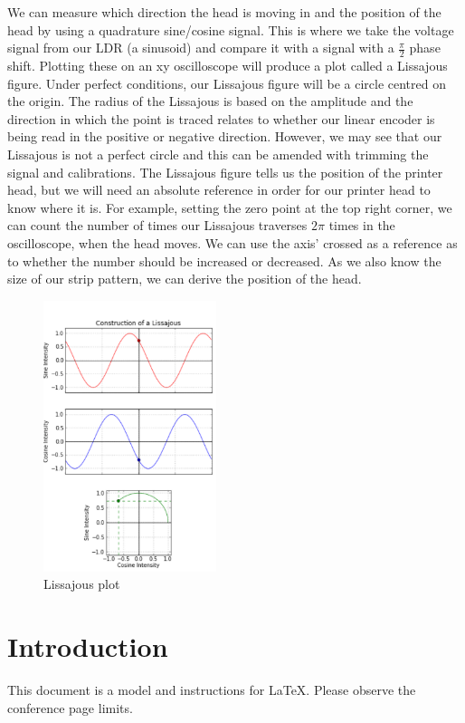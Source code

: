 \documentclass[conference]{IEEEtran}
\begin{document}
We can measure which direction the head is moving in and the position of the head by using a quadrature sine/cosine signal. This is where we take the voltage signal from our LDR (a sinusoid) and compare it with a signal with a $\frac{\pi}{2}$ phase shift. Plotting these on an xy oscilloscope will produce a plot called a Lissajous figure. Under perfect conditions, our Lissajous figure will be a circle centred on the origin. The radius of the Lissajous is based on the amplitude and the direction in which the point is traced relates to whether our linear encoder is being read in the positive or negative direction. However, we may see that our Lissajous is not a perfect circle and this can be amended with trimming the signal and calibrations. The Lissajous figure tells us the position of the printer head, but we will need an absolute reference in order for our printer head to know where it is. For example, setting the zero point at the top right corner, we can count the number of times our Lissajous traverses $2\pi$ times in the oscilloscope, when the head moves. We can use the axis' crossed as a reference as to whether the number should be increased or decreased. As we also know the size of our strip pattern, we can derive the position of the head.

\begin{figure}[htbp]
    \centerline{\includegraphics[width = 0.45\textwidth]{../img/Lissajous1.png}}
    \caption{Lissajous plot}
\end{figure}

\section{Introduction}
This document is a model and instructions for \LaTeX.
Please observe the conference page limits. 
\end{document}
